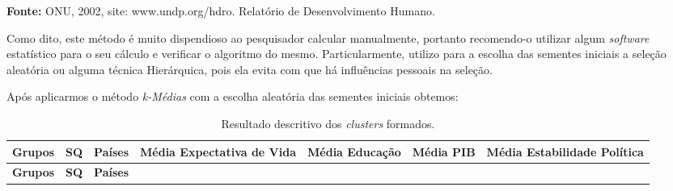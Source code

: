 \documentclass[
  openany]{book}
\begin{document}
\textbf{Fonte:} ONU, 2002, site: www.undp.org/hdro. Relatório de Desenvolvimento Humano.

Como dito, este método é muito dispendioso ao pesquisador calcular manualmente, portanto recomendo-o utilizar algum \emph{software} estatístico para o seu cálculo e verificar o algoritmo do mesmo. Particularmente, utilizo para a escolha das sementes iniciais a seleção aleatória ou alguma técnica Hierárquica, pois ela evita com que há influências pessoais na seleção.

Após aplicarmos o método \emph{k-Médias} com a escolha aleatória das sementes iniciais obtemos:

\begin{longtable}[]{@{}lllclll@{}}
\caption{\label{tab:exkmeans} Resultado descritivo dos \emph{clusters} formados.}\tabularnewline
\toprule
\begin{minipage}[b]{0.09\columnwidth}\raggedright
\textbf{Grupos}\strut
\end{minipage} & \begin{minipage}[b]{0.09\columnwidth}\raggedright
\textbf{SQ}\strut
\end{minipage} & \begin{minipage}[b]{0.09\columnwidth}\raggedright
\textbf{Países}\strut
\end{minipage} & \begin{minipage}[b]{0.27\columnwidth}\centering
\textbf{Média Expectativa de Vida}\strut
\end{minipage} & \begin{minipage}[b]{0.09\columnwidth}\raggedright
\textbf{Média Educação}\strut
\end{minipage} & \begin{minipage}[b]{0.09\columnwidth}\raggedright
\textbf{Média PIB}\strut
\end{minipage} & \begin{minipage}[b]{0.09\columnwidth}\raggedright
\textbf{Média Estabilidade Política}\strut
\end{minipage}\tabularnewline
\midrule
\endfirsthead
\toprule
\begin{minipage}[b]{0.09\columnwidth}\raggedright
\textbf{Grupos}\strut
\end{minipage} & \begin{minipage}[b]{0.09\columnwidth}\raggedright
\textbf{SQ}\strut
\end{minipage} & \begin{minipage}[b]{0.09\columnwidth}\raggedright
\textbf{Países}\strut
\end{minipage} & \begin{minipage}[b]{0.27\columnwidth}\centering

\end{minipage}
\end{longtable}
\end{document}
